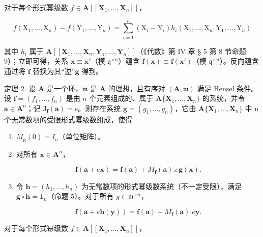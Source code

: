 对于每个形式幂级数 \(f \in \mathbf{A}[[\mathbf{X}_1, \ldots, \mathbf{X}_n]]\)，

\[
f \left(\mathrm{X} _ {1}, \dots , \mathrm{X} _ {n}\right) - f \left(\mathrm{Y} _ {1}, \dots , \mathrm{Y} _ {n}\right) = \sum_ {i = 1} ^ {n} \left(\mathrm{X} _ {i} - \mathrm{Y} _ {i}\right) h _ {i} \left(\mathrm{X} _ {1}, \dots , \mathrm{X} _ {n}, \mathrm{Y} _ {1}, \dots , \mathrm{Y} _ {n}\right)
\]

其中 \(h_i\) 属于 \(\mathbf{A}[[\mathbf{X}_1,\ldots,\mathbf{X}_n,\mathbf{Y}_1,\ldots,\mathbf{Y}_n]]\)（《代数》第 IV 章 § 5 第 8 节命题 9）；立即可得，关系 \(\mathbf{x} \equiv \mathbf{x}'\)（模 \(\mathfrak{q}^{\times n}\)）蕴含 \(\mathbf{f}(\mathbf{x}) \equiv \mathbf{f}(\mathbf{x}')\)（模 \(\mathfrak{q}^{\times n}\)）。反向蕴含通过将 \(\mathbf{f}\) 替换为其“逆”\(\mathbf{g}\) 得到。

定理 2. 设 \(\mathbf{A}\) 是一个环，\(\mathfrak{m}\) 是 \(\mathbf{A}\) 的理想，且有序对 \((\mathbf{A},\mathfrak{m})\) 满足 Hensel 条件。设 \(\mathbf{f} = (f_1,\ldots ,f_n)\) 是由 \(n\) 个元素组成的、属于 \(\mathbf{A}\{\mathbf{X}_1,\ldots ,\mathbf{X}_n\}\) 的系统，并令 \(\mathbf{a}\in \mathbf{A}^n\)；记 \(\mathrm{J}_{\mathbf{f}}(\mathbf{a}) = e\)。则存在系统 \(\mathbf{g} = (g_1,\dots ,g_n)\)，它由 \(\mathbf{A}\{\mathbf{X}_1,\dots ,\mathbf{X}_n\}\) 中 n 个无常数项的受限形式幂级数组成，使得

\begin{enumerate}
\def\labelenumi{(\roman{enumi})}
\item
  \(M_{\mathbf{g}}(0) = I_{n}\)（单位矩阵）。
\item
  对所有 \(\mathbf{x} \in \mathbf{A}^n\)，

\[
\mathbf {f} (\mathbf {a} + e \mathbf {x}) = \mathbf {f} (\mathbf {a}) + M _ {\mathbf {f}} (\mathbf {a}). e \mathbf {g} (\mathbf {x}).\tag{19}
\]

\item
  令 \(\mathbf{h} = (h_1, \ldots, h_n)\) 为无常数项的形式幂级数系统（不一定受限），满足 \(\mathbf{g} \circ \mathbf{h} = \mathbf{1}_n\)（命题 5）。对于所有 \(y \in \mathfrak{m}^{\times n}\)，

\[
\mathbf {f} (\mathbf {a} + e \mathbf {h} (\mathbf {y})) = \mathbf {f} (\mathbf {a}) + M _ {\mathbf {f}} (\mathbf {a}). e \mathbf {y}.\tag{20}
\]

\end{enumerate}

对于每个形式幂级数 \(f \in \mathbf{A}[[\mathbf{X}_1, \ldots, \mathbf{X}_n]]\)，

